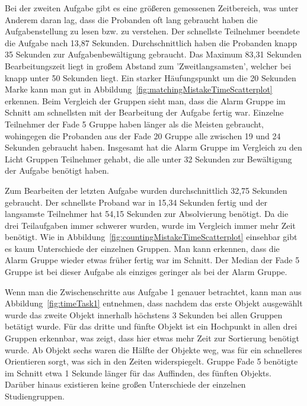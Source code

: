 Bei der zweiten Aufgabe gibt es eine größeren gemessenen Zeitbereich, was unter Anderem daran lag, dass die Probanden oft lang gebraucht haben die Aufgabenstellung zu lesen bzw. zu verstehen. Der schnellste Teilnehmer beendete die Aufgabe nach 13,87 Sekunden. Durchschnittlich haben die Probanden knapp 35 Sekunden zur Aufgabenbewältigung gebraucht. Das Maximum 83,31 Sekunden Bearbeitungszeit liegt in großem Abstand zum 'Zweitlangsamsten', welcher bei knapp unter 50 Sekunden liegt. Ein starker Häufungspunkt um die 20 Sekunden Marke kann man gut in Abbildung~\ref{fig:matchingMistakeTimeScatterplot} erkennen. 
Beim Vergleich der Gruppen sieht man, dass die Alarm Gruppe im Schnitt am schnellsten mit der Bearbeitung der Aufgabe fertig war. Einzelne Teilnehmer der Fade 5 Gruppe haben länger als die Meisten gebraucht, wohingegen die Probanden aus der Fade 20 Gruppe alle zwischen 19 und 24 Sekunden gebraucht haben. Insgesamt hat die Alarm Gruppe im Vergleich zu den Licht Gruppen Teilnehmer gehabt, die alle unter 32 Sekunden zur Bewältigung der Aufgabe benötigt haben.

Zum Bearbeiten der letzten Aufgabe wurden durchschnittlich 32,75 Sekunden gebraucht. Der schnellste Proband war in 15,34 Sekunden fertig und der langsamste Teilnehmer hat 54,15 Sekunden zur Absolvierung benötigt. Da die drei Teilaufgaben immer schwerer wurden, wurde im Vergleich immer mehr Zeit benötigt.
Wie in Abbildung~\ref{fig:countingMistakeTimeScatterplot} einsehbar gibt es kaum Unterschiede der einzelnen Gruppen. Man kann erkennen, dass die Alarm Gruppe wieder etwas früher fertig war im Schnitt. Der Median der Fade 5 Gruppe ist bei dieser Aufgabe als einziges geringer als bei der Alarm Gruppe.

Wenn man die Zwischenschritte aus Aufgabe 1 genauer betrachtet, kann man aus Abbildung~\ref{fig:timeTask1} entnehmen, dass nachdem das erste Objekt ausgewählt wurde das zweite Objekt innerhalb höchstens 3 Sekunden bei allen Gruppen betätigt wurde. Für das dritte und fünfte Objekt ist ein Hochpunkt in allen drei Gruppen erkennbar, was zeigt, dass hier etwas mehr Zeit zur Sortierung benötigt wurde. Ab Objekt sechs waren die Hälfte der Objekte weg, was für ein schnelleres Orientieren sorgt, was sich in den Zeiten widerspiegelt. Gruppe Fade 5 benötigte im Schnitt etwa 1 Sekunde länger für das Auffinden, des fünften Objekts. Darüber hinaus existieren keine großen Unterschiede der einzelnen Studiengruppen.
 
